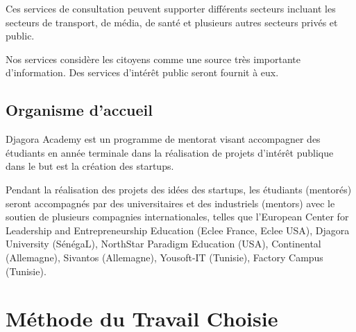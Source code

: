 Ces services de consultation peuvent supporter différents secteurs incluant
les secteurs de transport, de média, de santé et plusieurs autres secteurs
privés et public.

Nos services considère les citoyens comme une source très
importante d'information. Des services d'intérêt public seront fournit à eux.

\subsection{Organisme d'accueil}

Djagora Academy est un programme de mentorat visant accompagner des étudiants
en année terminale dans la réalisation de projets d'intérêt publique dans le but
est la création des startups.

Pendant la réalisation des projets des idées des startups, les étudiants
(mentorés)  seront accompagnés par des universitaires et des industriels
(mentors) avec le soutien de plusieurs compagnies internationales, telles que
l'European Center for Leadership and Entrepreneurship Education (Eclee France,
Eclee USA), Djagora University (SénégaL), NorthStar Paradigm Education (USA),
Continental (Allemagne), Sivantos (Allemagne), Yousoft-IT (Tunisie),
Factory Campus (Tunisie).


\section{Méthode du Travail Choisie}
